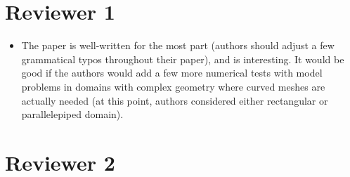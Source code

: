 \documentclass{article}
\newcommand{\note}[1]{{\color{blue}{#1}}}
\begin{document}

\note{We thank both Reviewers 1 and 2 for their feedback.  We describe steps taken to address reviewer comments and suggestions, which are described in the following response.  Revisions in the manuscript are also colored for ease of identification.  We hope these revisions improve the readability of this paper and its suitability for the audience of SISC.}

\section{Reviewer 1}

\begin{itemize}
\item The paper is well-written for the most part (authors should adjust a few grammatical typos throughout their paper), and is interesting.  It would be good if the authors would add a few more numerical tests with model problems in domains with complex geometry where curved meshes are actually needed (at this point, authors considered either rectangular or parallelepiped domain).

\note{blah}
\end{itemize}

\section{Reviewer 2}
\end{document}
